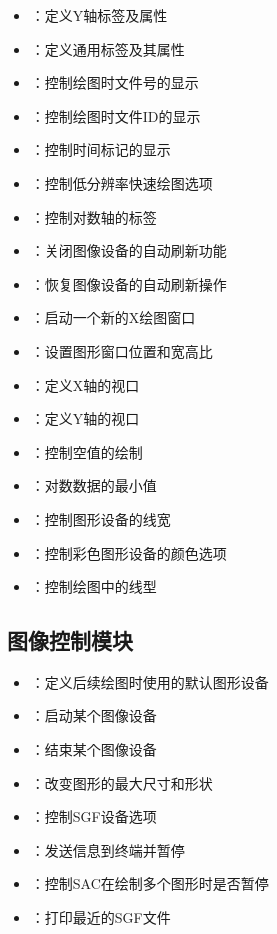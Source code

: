 \begin{itemize}
\item {}：定义Y轴标签及属性
\item {}：定义通用标签及其属性
\item {}：控制绘图时文件号的显示
\item {}：控制绘图时文件ID的显示
\item {}：控制时间标记的显示
\item {}：控制低分辨率快速绘图选项
\item {}：控制对数轴的标签
\item {}：关闭图像设备的自动刷新功能
\item {}：恢复图像设备的自动刷新操作
\item {}：启动一个新的X绘图窗口
\item {}：设置图形窗口位置和宽高比
\item {}：定义X轴的视口
\item {}：定义Y轴的视口
\item {}：控制空值的绘制
\item {}：对数数据的最小值
\item {}：控制图形设备的线宽
\item {}：控制彩色图形设备的颜色选项
\item {}：控制绘图中的线型
\end{itemize}

\subsection*{图像控制模块}
\begin{itemize}
\item {}：定义后续绘图时使用的默认图形设备
\item {}：启动某个图像设备
\item {}：结束某个图像设备
\item {}：改变图形的最大尺寸和形状
\item {}：控制SGF设备选项
\item {}：发送信息到终端并暂停
\item {}：控制SAC在绘制多个图形时是否暂停
\item {}：打印最近的SGF文件
\end{itemize}

